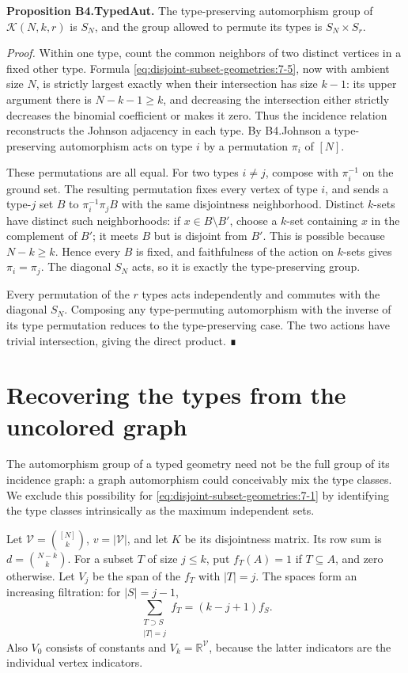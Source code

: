 \textbf{Proposition B4.TypedAut.} The type-preserving automorphism group of \(\mathcal K(N,k,r)\) is \(S_N\), and the group allowed to permute its types is \(S_N\times S_r\).

\emph{Proof.} Within one type, count the common neighbors of two distinct vertices in a fixed other type. Formula \eqref{eq:disjoint-subset-geometries:7-5}, now with ambient size \(N\), is strictly largest exactly when their intersection has size \(k-1\): its upper argument there is \(N-k-1\geq k\), and decreasing the intersection either strictly decreases the binomial coefficient or makes it zero. Thus the incidence relation reconstructs the Johnson adjacency in each type. By B4.Johnson a type-preserving automorphism acts on type \(i\) by a permutation \(\pi_i\) of \([N]\).

These permutations are all equal. For two types \(i\ne j\), compose with \(\pi_i^{-1}\) on the ground set. The resulting permutation fixes every vertex of type \(i\), and sends a type-\(j\) set \(B\) to \(\pi_i^{-1}\pi_j B\) with the same disjointness neighborhood. Distinct \(k\)-sets have distinct such neighborhoods: if \(x\in B\setminus B'\), choose a \(k\)-set containing \(x\) in the complement of \(B'\); it meets \(B\) but is disjoint from \(B'\). This is possible because \(N-k\geq k\). Hence every \(B\) is fixed, and faithfulness of the action on \(k\)-sets gives \(\pi_i=\pi_j\). The diagonal \(S_N\) acts, so it is exactly the type-preserving group.

Every permutation of the \(r\) types acts independently and commutes with the diagonal \(S_N\). Composing any type-permuting automorphism with the inverse of its type permutation reduces to the type-preserving case. The two actions have trivial intersection, giving the direct product. ∎
\section{Recovering the types from the uncolored graph}
The automorphism group of a typed geometry need not be the full group of its incidence graph: a graph automorphism could conceivably mix the type classes. We exclude this possibility for \eqref{eq:disjoint-subset-geometries:7-1} by identifying the type classes intrinsically as the maximum independent sets.

Let \(\mathscr V=\binom{[N]}k\), \(v=|\mathscr V|\), and let \(K\) be its disjointness matrix. Its row sum is \(d=\binom{N-k}{k}\). For a subset \(T\) of size \(j\leq k\), put \(f_T(A)=1\) if \(T\subseteq A\), and zero otherwise. Let \(V_j\) be the span of the \(f_T\) with \(|T|=j\). The spaces form an increasing filtration: for \(|S|=j-1\), \begin{equation}
\sum_{\substack{T\supset S\\ |T|=j}} f_T=(k-j+1)f_S.
\label{eq:disjoint-subset-geometries:7-6}
\end{equation} Also \(V_0\) consists of constants and \(V_k=\mathbb R^{\mathscr V}\), because the latter indicators are the individual vertex indicators.

